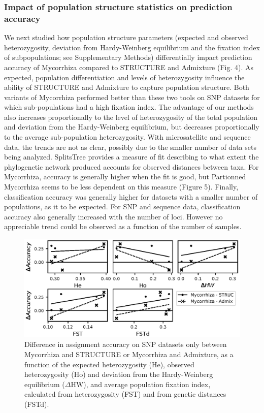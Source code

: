 \documentclass{bioinfo}
\begin{document}
\subsubsection{Impact of population structure statistics on prediction accuracy}
We next studied how population structure parameters (expected and observed heterozygosity, deviation from Hardy-Weinberg equilibrium and the fixation index of subpopulations; see Supplementary Methods) differentially impact prediction accuracy of Mycorrhiza compared to STRUCTURE and Admixture (Fig. 4). As expected, population differentiation and levels of heterozygosity influence the ability of STRUCTURE and Admixture to capture population structure. Both variants of Mycorrhiza performed better than these two tools on SNP datasets for which sub-populations had a high fixation index. The advantage of our methods  also increases proportionally to the level of heterozygosity of the total population and deviation from the Hardy-Weinberg equilibrium, but decreases proportionally to the average sub-population heterozygosity. With microsatellite and sequence data, the trends are not as clear, possibly due to the smaller number of data sets being analyzed. SplitsTree provides a measure of fit describing to what extent the phylogenetic network produced accounts for observed distances between taxa. For Mycorrhiza, accuracy is generally higher when the fit is good, but Partionned Mycorrhiza seems to be less dependent on this measure (Figure 5). Finally, classification accuracy was generally higher for datasets with a smaller number of populations, as it to be expected. For SNP and sequence data, classification accuracy also generally increased with the number of loci. However no appreciable trend could be observed as a function of the number of samples.
\begin{figure}[!tbp]%
    \includegraphics[width=\linewidth]{figure4.eps}
    \caption{Difference in assignment accuracy on SNP datasets only between Mycorrhiza and STRUCTURE or Mycorrhiza and Admixture, as a function of the expected heterozygosity (He), observed heterozygosity (Ho) and deviation from the Hardy-Weinberg equilibrium ($\Delta$HW), and average population fixation index, calculated from heterozygosity (FST) and from genetic distances (FSTd).}\label{fig:04}
\end{figure}
\end{document}
